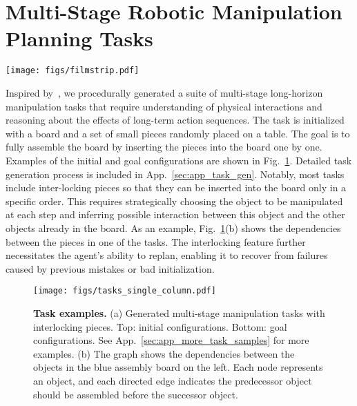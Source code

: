 \section{Multi-Stage Robotic Manipulation Planning Tasks}\label{sec:tasks}

\begin{figure*}[t!]
    \centering
    \texttt{[image: figs/filmstrip.pdf]}
    \caption{\textbf{Filmstrip of our method solving a complicated assembly task.} Frames are indexed by timestep. The goal image is in the top-left corner (with a green border). Each frame is the observation after executing the action (in black) above it. The other action in gray is the original action proposed by the VLM if it is revised after reflection. We highlight the reflection process at timestep 15, where the VLM first proposes an action to pick up the purple brick, but after reflection, it chooses to pick up the yellow brick instead as the generated future state (red-bordered image) shows little progress towards the goal.}
    \label{fig:filmstrip}
\end{figure*}
Inspired by~\citet{luo2024fmb}, we procedurally generated a suite of multi-stage long-horizon manipulation tasks that require understanding of physical interactions and reasoning about the effects of long-term action sequences. The task is initialized with a board and a set of small pieces randomly placed on a table. The goal is to fully assemble the board by inserting the pieces into the board one by one. Examples of the initial and goal configurations are shown in Fig.~\ref{fig:tasks}. Detailed task generation process is included in App.~\ref{sec:app_task_gen}. Notably, most tasks include inter-locking pieces so that they can be inserted into the board only in a specific order. This requires strategically choosing the object to be manipulated at each step and inferring possible interaction between this object and the other objects already in the board. 
As an example, Fig.~\ref{fig:tasks}(b) shows the dependencies between the pieces in one of the tasks. 
The interlocking feature further necessitates the agent’s ability to replan, enabling it to recover from failures caused by previous mistakes or bad initialization. 


\begin{figure}[h!]
    \centering
    \texttt{[image: figs/tasks\_single\_column.pdf]}
    \vspace{-0.1in}
    \caption{\textbf{Task examples.} (a) Generated multi-stage manipulation tasks with interlocking pieces. Top: initial configurations. Bottom: goal configurations. See App.~\ref{sec:app_more_task_samples} for more examples. (b) The graph shows the dependencies between the objects in the blue assembly board on the left. Each node represents an object, and each directed edge indicates the predecessor object should be assembled before the successor object.}
    \label{fig:tasks}
\end{figure}


